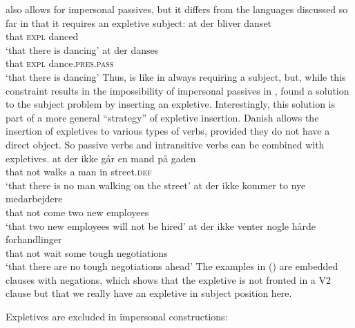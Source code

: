 \noindent
{} also allows for impersonal passives, but it differs from the languages discussed so far in
that it requires an expletive subject:
\eal
\ex\label{ex-at-der-bliver-danset} 
\gll at der bliver danset\\
     that \textsc{expl} \AUX{} danced\\\danish
\glt `that there is dancing'
\ex
\gll at der danses\\
     that \textsc{expl} dance.\textsc{pres}.\textsc{pass}\\
\glt `that there is dancing'
\zl
Thus,  is like  in always requiring a subject, but, while this constraint results in the
impossibility of impersonal passives in ,  found a solution to the subject problem by
inserting an expletive. Interestingly, this solution is part of a more general ``strategy'' of
expletive insertion. Danish allows the insertion of expletives to various types of verbs, provided
they do not have a direct object. So passive verbs and intransitive verbs can be combined with
expletives.
\eal
\ex 
\gll at    der    ikke går   en mand på gaden\\
     that \expl{} not  walks a  man  in street.\textsc{def}\\\danish
\glt `that there is no man walking on the street'
\ex 
\gll at   der     ikke kommer to  nye medarbejdere\\
     that \expl{} not  come   two new employees\\
\glt `that two new employees will not be hired'
\ex
\gll at   der     ikke venter nogle hårde forhandlinger\\
     that \expl{} not  wait   some  tough negotiations\\
\glt `that there are no tough negotiations ahead'
\zl
The examples in () are embedded clauses with negations, which shows that the expletive is not
fronted in a V2 clause but that we really have an expletive in subject position here.


Expletives are excluded in  impersonal constructions:
\nocite{MOe2011a}
\z
{}


